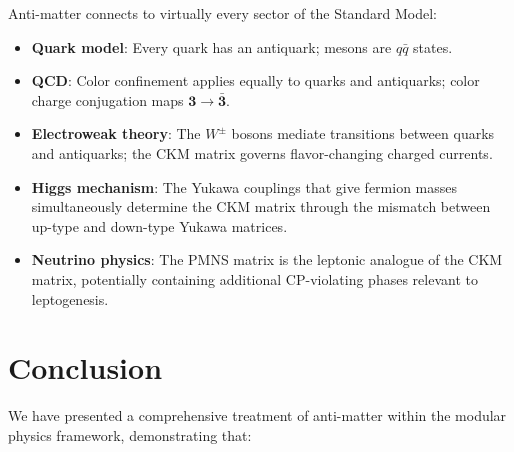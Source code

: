\documentclass[12pt]{article}
\theoremstyle{definition}
\theoremstyle{remark}
\begin{document}
Anti-matter connects to virtually every sector of the Standard Model:
\begin{itemize}
    \item \textbf{Quark model}: Every quark has an antiquark; mesons are $q\bar{q}$ states.
    \item \textbf{QCD}: Color confinement applies equally to quarks and antiquarks;
    color charge conjugation maps $\mathbf{3} \to \bar{\mathbf{3}}$.
    \item \textbf{Electroweak theory}: The $W^\pm$ bosons mediate transitions between
    quarks and antiquarks; the CKM matrix governs flavor-changing charged currents.
    \item \textbf{Higgs mechanism}: The Yukawa couplings that give fermion masses
    simultaneously determine the CKM matrix through the mismatch between up-type
    and down-type Yukawa matrices.
    \item \textbf{Neutrino physics}: The PMNS matrix is the leptonic analogue of the
    CKM matrix, potentially containing additional CP-violating phases relevant to
    leptogenesis.
\end{itemize}

\section{Conclusion}
\label{sec:conclusion}

We have presented a comprehensive treatment of anti-matter within the modular physics
framework, demonstrating that:
\end{document}
